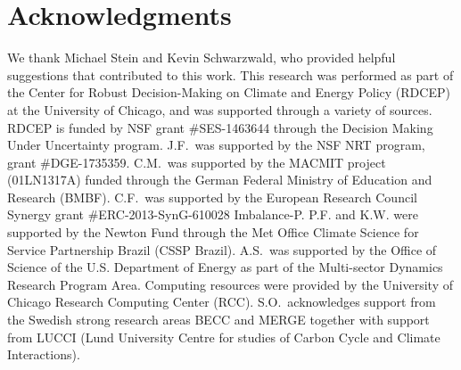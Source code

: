 \documentclass[preprint, 5p, times, twocolumn]{elsarticle}
\begin{document}



\section{Acknowledgments}
\label{S:5}
We thank Michael Stein and Kevin Schwarzwald, who provided helpful suggestions that contributed to this work. This research was performed as part of the Center for Robust Decision-Making on Climate and Energy Policy (RDCEP) at the University of Chicago, and was supported through a variety of sources. RDCEP is funded by NSF grant \#SES-1463644 through the Decision Making Under Uncertainty program. J.F.\ was supported by the NSF NRT program, grant \#DGE-1735359. C.M.\ was supported by the MACMIT project (01LN1317A) funded through the German Federal Ministry of Education and Research (BMBF).  C.F.\ was supported by the European Research Council Synergy grant \#ERC-2013-SynG-610028 Imbalance-P. P.F. and K.W. were supported  by the Newton Fund through the Met Office Climate Science for Service Partnership Brazil (CSSP Brazil). A.S.\ was supported by the Office of Science of the U.S. Department of Energy as part of the Multi-sector Dynamics Research Program Area. Computing resources were provided by the University of Chicago Research Computing Center (RCC). S.O.\ acknowledges support from the Swedish strong research areas BECC and MERGE together with support from LUCCI (Lund University Centre for studies of Carbon Cycle and Climate Interactions).
\end{document}

